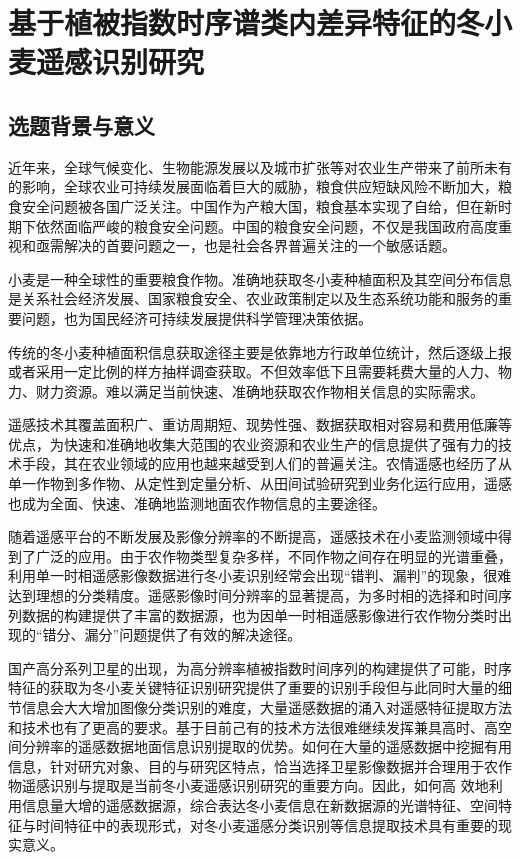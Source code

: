 \section{基于植被指数时序谱类内差异特征的冬小麦遥感识别研究}

\subsection{选题背景与意义}
近年来，全球气候变化、生物能源发展以及城市扩张等对农业生产带来了前所未有的影响，全球农业可持续发展面临着巨大的威胁，粮食供应短缺风险不断加大，粮食安全问题被各国广泛关注。中国作为产粮大国，粮食基本实现了自给，但在新时期下依然面临严峻的粮食安全问题。中国的粮食安全问题，不仅是我国政府高度重视和亟需解决的首要问题之一，也是社会各界普遍关注的一个敏感话题。

小麦是一种全球性的重要粮食作物。准确地获取冬小麦种植面积及其空间分布信息是关系社会经济发展、国家粮食安全、农业政策制定以及生态系统功能和服务的重要问题，也为国民经济可持续发展提供科学管理决策依据。

传统的冬小麦种植面积信息获取途径主要是依靠地方行政单位统计，然后逐级上报或者采用一定比例的样方抽样调查获取。不但效率低下且需要耗费大量的人力、物力、财力资源。难以满足当前快速、准确地获取农作物相关信息的实际需求。

遥感技术其覆盖面积广、重访周期短、现势性强、数据获取相对容易和费用低廉等优点，为快速和准确地收集大范围的农业资源和农业生产的信息提供了强有力的技术手段，其在农业领域的应用也越来越受到人们的普遍关注。农情遥感也经历了从单一作物到多作物、从定性到定量分析、从田间试验研究到业务化运行应用，遥感也成为全面、快速、准确地监测地面农作物信息的主要途径。

随着遥感平台的不断发展及影像分辨率的不断提高，遥感技术在小麦监测领域中得到了广泛的应用。由于农作物类型复杂多样，不同作物之间存在明显的光谱重叠，利用单一时相遥感影像数据进行冬小麦识别经常会出现“错判、漏判”的现象，很难达到理想的分类精度。遥感影像时间分辨率的显著提高，为多时相的选择和时间序列数据的构建提供了丰富的数据源，也为因单一时相遥感影像进行农作物分类时出现的“错分、漏分”问题提供了有效的解决途径。

国产高分系列卫星的出现，为高分辨率植被指数时间序列的构建提供了可能，时序特征的获取为冬小麦关键特征识别研究提供了重要的识别手段但与此同时大量的细节信息会大大增加图像分类识别的难度，大量遥感数据的涌入对遥感特征提取方法和技术也有了更高的要求。基于目前己有的技术方法很难继续发挥兼具高时、高空间分辨率的遥感数据地面信息识别提取的优势。如何在大量的遥感数据中挖掘有用信息，针对研宄对象、目的与研究区特点，恰当选择卫星影像数据并合理用于农作物遥感识别与提取是当前冬小麦遥感识别研究的重要方向。因此，如何高
效地利用信息量大增的遥感数据源，综合表达冬小麦信息在新数据源的光谱特征、空间特征与时间特征中的表现形式，对冬小麦遥感分类识别等信息提取技术具有重要的现实意义。

